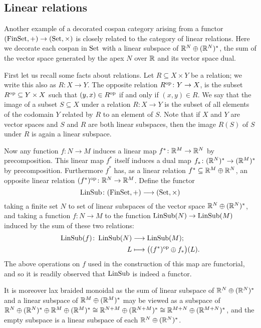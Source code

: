 \subsection{Linear relations} 
Another example of a decorated cospan category arising from a functor $(\mathrm{FinSet},+)
\to (\mathrm{Set}, \times)$ is closely related to the category of linear relations. Here
we decorate each cospan in $\mathrm{Set}$ with a linear subspace of ${\mathbb{R}}^N \oplus
({\mathbb{R}}^N)^\ast$, the sum of the vector space generated by the apex $N$ over ${\mathbb{R}}$
and its vector space dual.

First let us recall some facts about relations. Let $R \subseteq X\times Y$ be
a relation; we write this also as $R\colon  X \to Y$. The opposite relation $R^{\mathrm{op}}\colon 
Y\to X$, is the subset $R^{\mathrm{op}} \subseteq Y\times X$ such that $(y,x) \in R^{\mathrm{op}}$
if and only if $(x,y) \in R$. We say that the image of a subset $S \subseteq X$
under a relation $R\colon  X \to Y$ is the subset of all elements of the codomain $Y$
related by $R$ to an element of $S$. Note that if $X$ and $Y$ are vector spaces
and $S$ and $R$ are both linear subspaces, then the image $R(S)$ of $S$ under
$R$ is again a linear subspace.

Now any function $f\colon N \to M$ induces a linear map $f^\ast\colon  {\mathbb{R}}^M \to
{\mathbb{R}}^N$ by precomposition. This linear map $f^\ast$ itself induces a dual map
$f_\ast\colon ({\mathbb{R}}^N)^\ast \to ({\mathbb{R}}^M)^\ast$ by precomposition. Furthermore
$f^\ast$ has, as a linear relation $f^\ast \subseteq {\mathbb{R}}^M \oplus {\mathbb{R}}^N$, an
opposite linear relation $(f^\ast)^{\mathrm{op}}\colon  {\mathbb{R}}^N \to {\mathbb{R}}^M$.  Define the
functor 
\[
  \operatorname{LinSub}\colon  (\mathrm{FinSet},+) \longrightarrow (\mathrm{Set},\times)
\]
taking a finite set $N$ to set of linear subspaces of the vector space ${\mathbb{R}}^N
\oplus ({\mathbb{R}}^N)^\ast$, and taking a function $f\colon  N \to M$ to the function
$\operatorname{LinSub}(N) \to \operatorname{LinSub}(M)$ induced by the sum of these two relations:
\begin{align*}
  \operatorname{LinSub}(f)\colon  \operatorname{LinSub}(N) &\longrightarrow \operatorname{LinSub}(M); \\
  L &\longmapsto \big((f^\ast)^{\mathrm{op}} \oplus f_\ast\big)(L).
\end{align*}
The above operations on $f$ used in the construction of this map are functorial,
and so it is readily observed that $\operatorname{LinSub}$ is indeed a functor.

It is moreover lax braided monoidal as the sum of linear subspace of ${\mathbb{R}}^N
\oplus ({\mathbb{R}}^N)^\ast$ and a linear subspace of ${\mathbb{R}}^M \oplus ({\mathbb{R}}^M)^\ast$ may be
viewed as a subspace of ${\mathbb{R}}^N \oplus ({\mathbb{R}}^N)^\ast \oplus {\mathbb{R}}^M \oplus ({\mathbb{R}}^M)^\ast
\cong {\mathbb{R}}^{N+M} \oplus ({\mathbb{R}}^{N+M})^\ast \cong {\mathbb{R}}^{M+N} \oplus ({\mathbb{R}}^{M+N})^\ast$,
and the empty subspace is a linear subspace of each ${\mathbb{R}}^N \oplus ({\mathbb{R}}^N)^\ast$.

